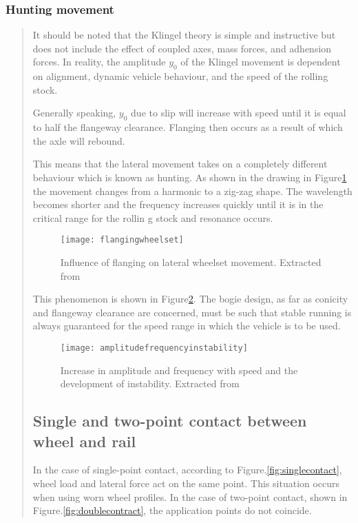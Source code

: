\subsubsection{Hunting movement}
\begin{quote}
It should be noted that the Klingel theory is simple and instructive but does not include the effect of coupled axes, mass forces, and adhension forces. In reality, the amplitude $y_0$ of the Klingel movement is dependent on alignment, dynamic vehicle behaviour, and the speed of the rolling stock. 

Generally speaking, $y_0$ due to slip will increase with speed until it is equal to half the flangeway clearance. Flanging then occurs as a result of which the axle will rebound. 

This means that the lateral movement takes on a completely different behaviour which is known as hunting. As shown in the drawing in Figure\ref{fig:flangingwheelset} the movement changes from a harmonic to a zig-zag shape. The wavelength becomes shorter and the frequency increases quickly until it is in the critical range for the rollin g stock and resonance occurs.

\begin{figure}[h!]
    \centering
    \texttt{[image: flangingwheelset]}
    \caption{Influence of flanging on lateral wheelset movement. Extracted from \citet[Figure 2.5]{esveld2001modern}}
    \label{fig:flangingwheelset}
\end{figure}

This phenomenon is shown in Figure\ref{fig:amplitudefrequencystability}. The bogie design, as far as conicity and flangeway clearance are concerned, must be such that stable running is always guaranteed for the speed range in which the vehicle is to be used.


\begin{figure}[h!]
    \centering
    \texttt{[image: amplitudefrequencyinstability]}
    \caption{Increase in amplitude and frequency with speed and the development of instability. Extracted from \citet[Figure 2.6]{esveld2001modern}}
    \label{fig:amplitudefrequencystability}
\end{figure}

\subsection{Single and two-point contact between wheel and rail}
In the case of single-point contact, according to Figure.\ref{fig:singlecontact}, wheel load and lateral force act on the same point. This situation occurs when using worn wheel profiles. In the case of two-point contact, shown in Figure.\ref{fig:doublecontract}, the application points do not coincide.


\end{quote}
